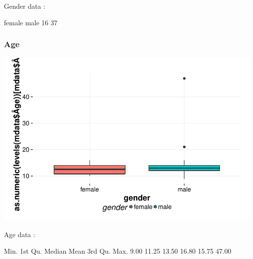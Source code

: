 \documentclass{article}
\begin{document}
Gender data : 
\begin{Schunk}
\begin{Soutput}
female   male 
    16     37 
\end{Soutput}
\end{Schunk}

\subsubsection{Age}
\includegraphics{Raw_num/plots/-plot_gender_age}

Age data : 
\begin{Schunk}
\begin{Soutput}
   Min. 1st Qu.  Median    Mean 3rd Qu.    Max. 
   9.00   11.25   13.50   16.80   15.75   47.00 
\end{Soutput}
\end{Schunk}
\end{document}
